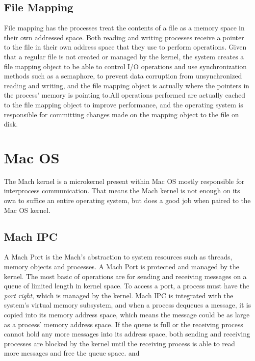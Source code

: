 \documentclass[12pt]{article}
\begin{document}
	
\subsection{File Mapping}
	File mapping has the processes treat the contents of a file as a memory space in their own addressed space. Both reading and writing processes receive a pointer to the file in their own address space that they use to perform operations. Given that a regular file is not created or managed by the kernel, the system creates a file mapping object to be able to control I/O operations and use synchronization methods such as a semaphore, to prevent data corruption from unsynchronized reading and writing, and the file mapping object is actually where the pointers in the process’ memory is pointing to.All operations performed are actually cached to the file mapping object to improve performance, and the operating system is responsible for committing changes made on the mapping object to the file on disk. \cite{winfilemapping:1}
	
\section{Mac OS}
The Mach kernel is a microkernel present within Mac OS mostly responsible for interprocess communication. That means the Mach kernel is not enough on its own to suffice an entire operating system, but does a good job when paired to the Mac OS kernel. \cite{macosipc:1}
\subsection{Mach IPC}
	A Mach Port is the Mach’s abstraction to system resources such as threads, memory objects and processes. A Mach Port is protected and managed by the kernel. The most basic of operations are for sending and receiving messages on a queue of limited length in kernel space. To access a port, a process must have the \emph{port right}, which is managed by the kernel. Mach IPC is integrated with the system's virtual memory subsystem, and when a process dequeues a message, it is copied into its memory address space, which means the message could be as large as a process’ memory address space. If the queue is full or the receiving process cannot hold any more messages into its address space, both sending and receiving processes are blocked by the kernel until the receiving process is able to read more messages and free the queue space. \cite{osxinternals:1} and \cite{osxsystem:1}
	
\end{document}
